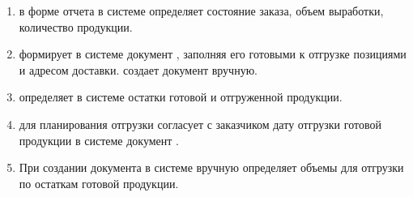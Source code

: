 \begin{enumerate}
    \item \manager в форме отчета  в системе \gofro определяет состояние заказа, объем  выработки, количество продукции.
    \item \manager формирует в системе \gofro документ , заполняя его готовыми к отгрузке позициями и адресом доставки. \manager создает документ вручную.
    
    \item	\manager определяет в системе \erp остатки готовой и отгруженной продукции.
    \item	\manager для планирования отгрузки согласует с заказчиком дату отгрузки готовой продукции в системе \erp документ .
    \item	При создании документа в системе \erp \manager вручную определяет объемы для отгрузки по остаткам готовой продукции.
\end{enumerate}






